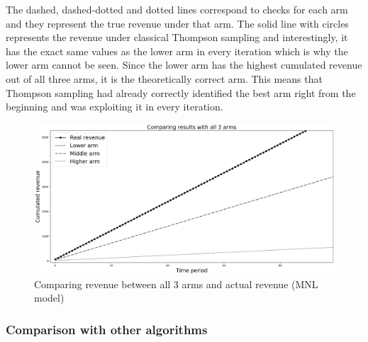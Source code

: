 \documentclass[a4paper]{article}
\begin{document}
\newline
\newline
The dashed, dashed-dotted and dotted lines correspond to checks for each arm and they represent the true revenue under that arm. The solid line with circles represents the revenue under classical Thompson sampling and interestingly, it has the exact same values as the lower arm in every iteration which is why the lower arm cannot be seen. Since the lower arm has the highest cumulated revenue out of all three arms, it is the theoretically correct arm. This means that Thompson sampling had already correctly identified the best arm right from the beginning and was exploiting it in every iteration.
\begin{figure}[h]
	\centering
	\includegraphics[width=1.03\textwidth]{Figure_1-2.png}
	\caption{\label{fig:one}Comparing revenue between all 3 arms and actual revenue (MNL model)}
\end{figure}

\subsubsection{Comparison with other algorithms}
\end{document}
